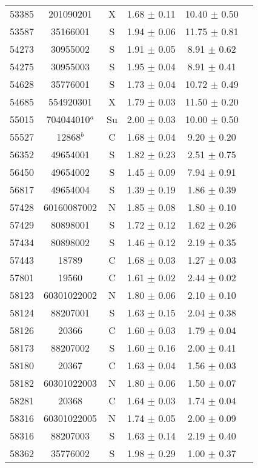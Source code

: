 \begin{center}
\begin{longtable}{cccccc}
53385 & 201090201 & X & 1.68 $\pm$ 0.11 & 10.40 $\pm$ 0.50 & \\
53587 & 35166001 & S & 1.94 $\pm$ 0.06 & 11.75 $\pm$ 0.81 & \\
54273 & 30955002 & S & 1.91 $\pm$ 0.05 & 8.91 $\pm$ 0.62 & \\
54275 & 30955003 & S & 1.95 $\pm$ 0.04 & 8.91 $\pm$ 0.41 & \\
54628 & 35776001 & S & 1.73 $\pm$ 0.04 & 10.72 $\pm$ 0.49 & \\
54685 & 554920301 & X & 1.79 $\pm$ 0.03 & 11.50 $\pm$ 0.20 & \\
55015 & 704044010$^{a}$ & Su  & 2.00 $\pm$ 0.03 & 10.00 $\pm$ 0.50  \\
55527 & 12868$^{b}$ & C  & 1.68 $\pm$ 0.04 & 9.20 $\pm$ 0.20  \\
56352 & 49654001 & S & 1.82 $\pm$ 0.23 & 2.51 $\pm$ 0.75 & \\
56450 & 49654002 & S & 1.45 $\pm$ 0.09 & 7.94 $\pm$ 0.91 & \\
56817 & 49654004 & S & 1.39 $\pm$ 0.19 & 1.86 $\pm$ 0.39 & \\
57428 & 60160087002 & N & 1.85 $\pm$ 0.08 & 1.80 $\pm$ 0.10 & \\
57429 & 80898001 & S & 1.72 $\pm$ 0.12 & 1.62 $\pm$ 0.26 & \\
57434 & 80898002 & S & 1.46 $\pm$ 0.12 & 2.19 $\pm$ 0.35 & \\
57443 & 18789 & C & 1.68 $\pm$ 0.03 & 1.27 $\pm$ 0.03 & \\
57801 & 19560 & C & 1.61 $\pm$ 0.02 & 2.44 $\pm$ 0.02 & \\
58123 & 60301022002 & N & 1.80 $\pm$ 0.06 & 2.10 $\pm$ 0.10 & \\
58124 & 88207001 & S & 1.63 $\pm$ 0.15 & 2.04 $\pm$ 0.38 & \\
58126 & 20366 & C & 1.60 $\pm$ 0.03 & 1.79 $\pm$ 0.04 & \\
58173 & 88207002 & S & 1.60 $\pm$ 0.16 & 2.00 $\pm$ 0.41 & \\
58180 & 20367 & C & 1.63 $\pm$ 0.04 & 1.56 $\pm$ 0.03 & \\
58182 & 60301022003 & N & 1.80 $\pm$ 0.06 & 1.50 $\pm$ 0.07 & \\
58281 & 20368 & C & 1.64 $\pm$ 0.03 & 1.74 $\pm$ 0.04 & \\
58316 & 60301022005 & N & 1.74 $\pm$ 0.05 & 2.00 $\pm$ 0.09 & \\
58316 & 88207003 & S & 1.63 $\pm$ 0.14 & 2.19 $\pm$ 0.40 & \\
58362 & 35776002 & S & 1.98 $\pm$ 0.29 & 1.00 $\pm$ 0.37 & \\

\end{longtable}
\end{center}
